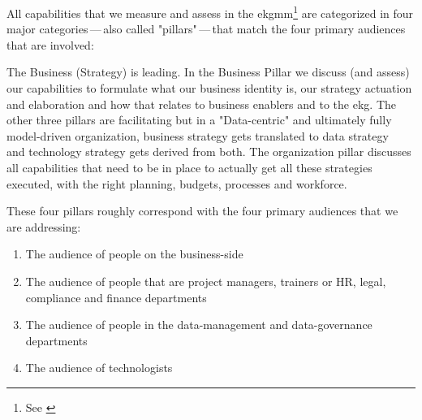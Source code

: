 %
%
\label{sec:the-four-capability-domains}
All capabilities that we measure and assess in the \gls{ekgmm}\footnote{See \autocite{ekgmm}} are categorized
in four major categories\,---\,also called "pillars"\,---\,that match the four primary audiences that are involved:

The Business (Strategy) is leading.
In the Business Pillar we discuss (and assess) our capabilities to formulate what our business identity is,
our strategy actuation and elaboration and how that relates to business enablers and to the \gls{ekg}.
The other three pillars are facilitating but in a "Data-centric" and ultimately fully model-driven
organization, business strategy gets translated to data strategy~
and technology strategy gets derived from both.
The organization pillar discusses all capabilities that need to be in place to actually get all these strategies
executed, with the right planning, budgets, processes and workforce.


These four pillars roughly correspond with the four primary audiences that we are addressing:

\begin{enumerate}
    \item The audience of people on the business-side
    \item The audience of people that are project managers, trainers or HR, legal, compliance and finance departments
    \item The audience of people in the data-management and data-governance departments
    \item The audience of technologists
\end{enumerate}
